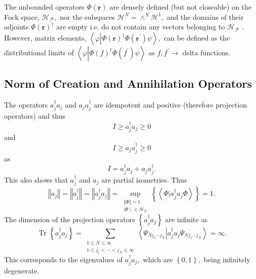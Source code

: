 \documentclass[aps,preprint]{revtex4}%
\begin{document}
The unbounded operators $\Phi\left(  \boldsymbol{r}\right)  $ are densely
defined (but not closeable) on the Fock space, $\mathcal{H}_{\mathcal{F}},$
nor the subspaces $\mathcal{H}^{N}=\wedge^{N}\mathcal{H}^{1},$ and the domains
of their adjoints $\Phi\left(  \boldsymbol{r}\right)  ^{\dagger}$ are empty
i.e. do not contain any vectors belonging to $\mathcal{H}_{\mathcal{F}}$
\cite{Thirring}. However, matrix elements, $\left\langle \varphi\left\vert
\Phi\left(  \boldsymbol{r}\right)  ^{\dagger}\Phi\left(  \boldsymbol{r}%
^{\prime}\right)  \right.  \psi\right\rangle ,$ can be defined as the
distributional limits of $\left\langle \varphi\left\vert \Phi\left(  f\right)
^{\dagger}\Phi\left(  f^{\prime}\right)  \right.  \psi\right\rangle $ as
$f,f^{\prime}\rightarrow$ delta functions.

\subsection{Norm of Creation and Annihilation Operators}

The operators $a_{j}^{\dagger}a_{j}$ and $a_{j}a_{j}^{\dagger}$ are idempotent
and positive (therefore projection operators) and thus
\begin{equation}
I\geq a_{j}^{\dagger}a_{j}\geq0
\end{equation}
and
\begin{equation}
I\geq a_{j}a_{j}^{\dagger}\geq0
\end{equation}
as
\begin{equation}
I=a_{j}^{\dagger}a_{j}+a_{j}a_{j}^{\dagger}.
\end{equation}
This also shows that $a_{j}^{\dagger}$ and $a_{j}$ are partial isometries.
Thus
\begin{equation}
\left\Vert a_{j}\right\Vert =\left\Vert a_{j}^{\dagger}\right\Vert =\left\Vert
a_{j}^{\dagger}a_{j}\right\Vert =\sup_{\substack{\left\Vert \Phi\right\Vert
=1\\\left\vert \Phi\right\rangle \in\mathcal{H}_{F}}}\left\{  \left\langle
\left.  \Phi\right\vert a_{j}^{\dagger}a_{j}\Phi\right\rangle \right\}  =1.
\label{OccOpNorm}%
\end{equation}
The dimension of the projection operators $\left\{  a_{j}^{\dagger}%
a_{j}\right\}  $ are infinite as
\begin{equation}
\operatorname*{Tr}\left\{  a_{j}^{\dagger}a_{j}\right\}  =\sum
_{\substack{1\leq N\leq\infty\\1\leq j_{1}<\cdots<j_{N}\leq\infty
}}\left\langle \Psi_{Nj_{1}\cdots j_{N}}\left\vert a_{j}^{\dagger}a_{j}%
\Psi_{Nj_{1}\cdots j_{N}}\right.  \right\rangle =\infty.
\end{equation}
This corresponds to the eigenvalues of $a_{j}^{\dagger}a_{j},$ which are
$\left\{  0,1\right\}  ,$ being infinitely degenerate.
\end{document}

